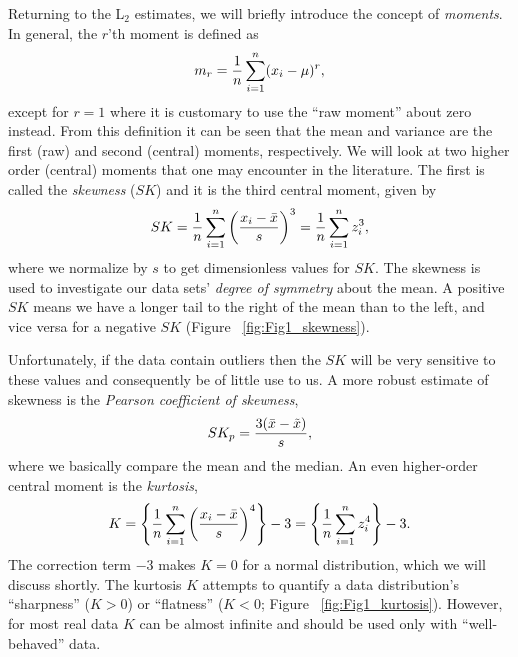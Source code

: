 	Returning to the L$_2$ estimates, we will briefly introduce the concept of \emph{moments}.  In general, 
the $r$'th moment is defined as
\begin{equation}
	\index{Moments}
m_r = \frac{1}{n} \sum^n_{i = 1} (x_i - \mu)^r,
\end{equation}
except for $r = 1$ where it is customary to use the ``raw moment'' about zero instead.  From this definition it can be seen
that the mean and variance are the first (raw) and second (central) moments, 
respectively.  We will look at two higher order (central) moments that one may encounter in the literature.  
The first is called the \emph{skewness} ($SK$) and it is the third central moment, given by
\begin{equation}
	\index{Skewness}
	\index{Data!skewness}
SK = \frac{1}{n} \sum ^n_{i=1} \left ( \frac{x_i - \bar{x}} {s} \right) ^3 = \frac{1}{n} \sum ^n_{i=1} z_i^3,
\end{equation}
where we normalize by $s$ to get dimensionless values for $SK$.  The skewness is used to investigate 
our data sets' \emph{degree of symmetry} about the mean.  A positive $SK$ means we have a longer tail 
to the right of the mean than to the left, and vice versa for a negative $SK$ (Figure ~\ref{fig:Fig1_skewness}).


\noindent
Unfortunately, if the data contain outliers then the $SK$ will be very sensitive to these values and 
consequently be of little use to us.  A more robust estimate of skewness is the \emph{Pearson 
coefficient of skewness},
\begin{equation}
	\index{Pearson skewness}
	\index{Skewness!Pearson}
SK_p = \frac{3(\bar{x} - \tilde{x})} {s},
\end{equation}
where we basically compare the mean and the median.  An even higher-order central moment is the 
\emph{kurtosis},
\begin{equation}
	\index{Kurtosis}
	\index{Data!kurtosis}
K  = \left \{ \frac{1}{n} \sum^n_{i=1} \left ( \frac{x_i - \bar{x}}{s} \right) ^4 \right \} -3 = \left \{ \frac{1}{n} \sum ^n_{i=1} z_i^4 \right \} - 3.
\end{equation}
The correction term $-3$ makes $K = 0$ for a normal distribution, which we will discuss shortly.  The kurtosis $K$ attempts to 
quantify a data distribution's ``sharpness'' ($K > 0$) or ``flatness'' ($K < 0$; Figure ~\ref{fig:Fig1_kurtosis}).
However, for most real data $K$ can be almost infinite and should be used only with 
``well-behaved'' data.

